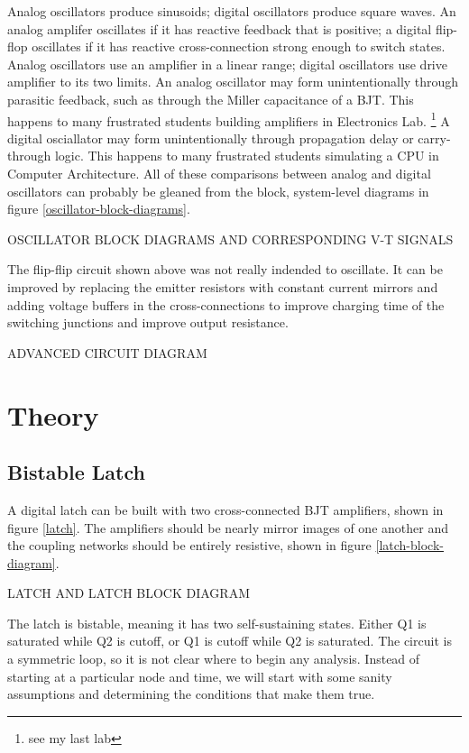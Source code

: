 \documentclass[titlepage, letterpaper, 10.5pt]{article}
\begin{document}
Analog oscillators produce sinusoids; digital oscillators produce square waves.
An analog amplifer oscillates if it has reactive feedback that is positive;
a digital flip-flop oscillates if it has reactive cross-connection strong enough to switch states.
Analog oscillators use an amplifier in a linear range; digital oscillators use drive
amplifier to its two limits.
An analog oscillator may form unintentionally through parasitic feedback,
such as through the Miller capacitance of a BJT.
This happens to many frustrated students building amplifiers in Electronics Lab.
\footnote{see my last lab}
A digital osciallator may form unintentionally through propagation delay or carry-through
logic. This happens to many frustrated students simulating a CPU in Computer Architecture.
All of these comparisons between analog and digital oscillators can probably be gleaned
from the block, system-level diagrams in figure \ref{oscillator-block-diagrams}.

OSCILLATOR BLOCK DIAGRAMS AND CORRESPONDING V-T SIGNALS

The flip-flip circuit shown above was not really indended to oscillate.
It can be improved by replacing the emitter resistors with constant current mirrors
and adding voltage buffers in the cross-connections to improve charging time of the
switching junctions and improve output resistance.

ADVANCED CIRCUIT DIAGRAM

\section{Theory}

\subsection{Bistable Latch}

A digital latch can be built with two cross-connected BJT amplifiers, shown in figure
\ref{latch}. The amplifiers should be nearly mirror images of one another and the
coupling networks should be entirely resistive, shown in figure 
\ref{latch-block-diagram}.

LATCH  AND LATCH BLOCK DIAGRAM

The latch is bistable, meaning it has two self-sustaining states.
Either Q1 is saturated while Q2 is cutoff, or Q1 is cutoff while Q2 is saturated.
The circuit is a symmetric loop, so it is not clear where to begin any analysis.
Instead of starting at a particular node and time, we will start with some sanity
assumptions and determining the conditions that make them true.
\end{document}
